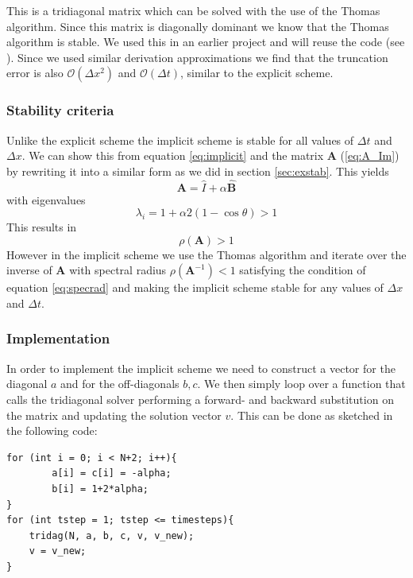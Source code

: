 \documentclass[%
 reprint,
nofootinbib,
aps,
]{revtex4-1}
\renewcommand{\vec}[1]{\mathbf{#1}} %
\begin{document}
This is a tridiagonal matrix which can be solved with the use of the Thomas algorithm. Since this matrix is diagonally dominant we know that the Thomas algorithm is stable. We used this in an earlier project and will reuse the code (see \cite{project1}). Since we used similar derivation approximations we find that the truncation error is also $\mathcal{O}(\Delta x^2)$ and $\mathcal{O}(\Delta t)$, similar to the explicit scheme.

\subsubsection{Stability criteria}
Unlike the explicit scheme the implicit scheme is stable for all values of $\Delta t$ and $\Delta x$. We can show this from equation \ref{eq:implicit} and the matrix \textbf{A} (\ref{eq:A_Im}) by rewriting it into a similar form as we did in section \ref{sec:exstab}. This yields $${\vec{A}} = \hat I + \alpha \hat{\vec{B}}$$ with eigenvalues $$\lambda_i = 1 + \alpha 2 (1-\cos \theta) > 1$$ This results in $$\rho(\textbf{A})>1$$ However in the implicit scheme we use the Thomas algorithm and iterate over the inverse of \textbf{A} with spectral radius $\rho(\textbf{A}^{-1})<1$ satisfying the condition of equation \ref{eq:specrad} and making the implicit scheme stable for any values of $\Delta x$ and $\Delta t$.

\subsubsection{Implementation}
In order to implement the implicit scheme we need to construct a vector for the diagonal $a$ and for the off-diagonals $b,c$. We then simply loop over a function that calls the tridiagonal solver performing a forward- and backward substitution on the matrix and updating the solution vector $v$. This can be done as sketched in the following code:
\begin{verbatim}
for (int i = 0; i < N+2; i++){
	    a[i] = c[i] = -alpha;
	    b[i] = 1+2*alpha;
}
for (int tstep = 1; tstep <= timesteps){
    tridag(N, a, b, c, v, v_new);
    v = v_new;
}
\end{verbatim}

\end{document}

